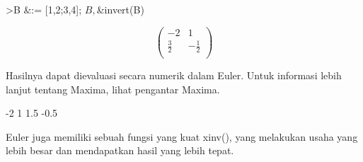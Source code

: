 \documentclass{article}
\begin{document}
\begin{eulernotebook}
\begin{eulerttcomment}
\end{eulerttcomment}
\begin{eulerprompt}
>B &:= [1,2;3,4]; $B, $&invert(B)
\end{eulerprompt}
\begin{eulerformula}
\[
\begin{pmatrix}-2 & 1 \\ \frac{3}{2} & -\frac{1}{2} \\   \end{pmatrix}
\]
\end{eulerformula}
\begin{eulercomment}
Hasilnya dapat dievaluasi secara numerik dalam Euler. Untuk informasi
lebih lanjut tentang Maxima, lihat pengantar Maxima.
\end{eulercomment}
\begin{euleroutput}
             -2             1 
            1.5          -0.5 
\end{euleroutput}
\begin{eulercomment}
Euler juga memiliki sebuah fungsi yang kuat xinv(), yang melakukan
usaha yang lebih besar dan mendapatkan hasil yang lebih tepat.



\end{eulercomment}
\end{eulernotebook}
\end{document}
